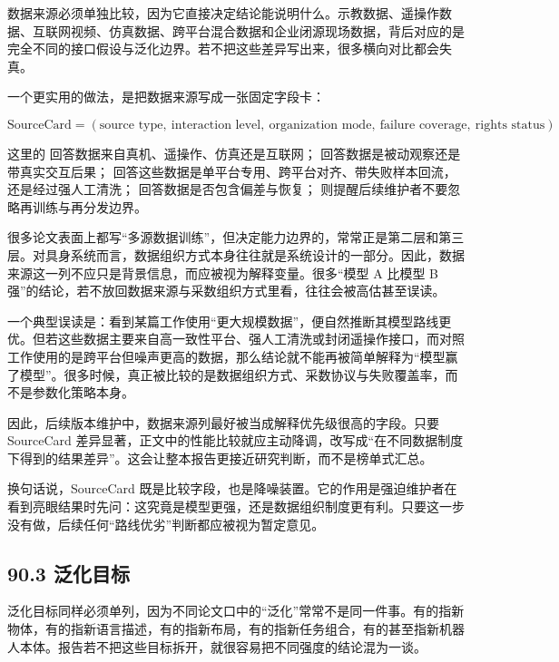 数据来源必须单独比较，因为它直接决定结论能说明什么。示教数据、遥操作数据、互联网视频、仿真数据、跨平台混合数据和企业闭源现场数据，背后对应的是完全不同的接口假设与泛化边界。若不把这些差异写出来，很多横向对比都会失真。

一个更实用的做法，是把数据来源写成一张固定字段卡：

\begingroup
\scriptsize
\begin{equation*}
\text{SourceCard} = (\text{source type},\ \text{interaction level},\ \text{organization mode},\ \text{failure coverage},\ \text{rights status})
\end{equation*}
\endgroup

这里的 \texttt{} 回答数据来自真机、遥操作、仿真还是互联网；\texttt{} 回答数据是被动观察还是带真实交互后果；\texttt{} 回答这些数据是单平台专用、跨平台对齐、带失败样本回流，还是经过强人工清洗；\texttt{} 回答数据是否包含偏差与恢复；\texttt{} 则提醒后续维护者不要忽略再训练与再分发边界。

很多论文表面上都写“多源数据训练”，但决定能力边界的，常常正是第二层和第三层。对具身系统而言，数据组织方式本身往往就是系统设计的一部分。因此，数据来源这一列不应只是背景信息，而应被视为解释变量。很多“模型 A 比模型 B 强”的结论，若不放回数据来源与采数组织方式里看，往往会被高估甚至误读。

一个典型误读是：看到某篇工作使用“更大规模数据”，便自然推断其模型路线更优。但若这些数据主要来自高一致性平台、强人工清洗或封闭遥操作接口，而对照工作使用的是跨平台但噪声更高的数据，那么结论就不能再被简单解释为“模型赢了模型”。很多时候，真正被比较的是数据组织方式、采数协议与失败覆盖率，而不是参数化策略本身。

因此，后续版本维护中，数据来源列最好被当成解释优先级很高的字段。只要 SourceCard 差异显著，正文中的性能比较就应主动降调，改写成“在不同数据制度下得到的结果差异”。这会让整本报告更接近研究判断，而不是榜单式汇总。

换句话说，SourceCard 既是比较字段，也是降噪装置。它的作用是强迫维护者在看到亮眼结果时先问：这究竟是模型更强，还是数据组织制度更有利。只要这一步没有做，后续任何“路线优劣”判断都应被视为暂定意见。

\subsection*{90.3 泛化目标}


泛化目标同样必须单列，因为不同论文口中的“泛化”常常不是同一件事。有的指新物体，有的指新语言描述，有的指新布局，有的指新任务组合，有的甚至指新机器人本体。报告若不把这些目标拆开，就很容易把不同强度的结论混为一谈。

